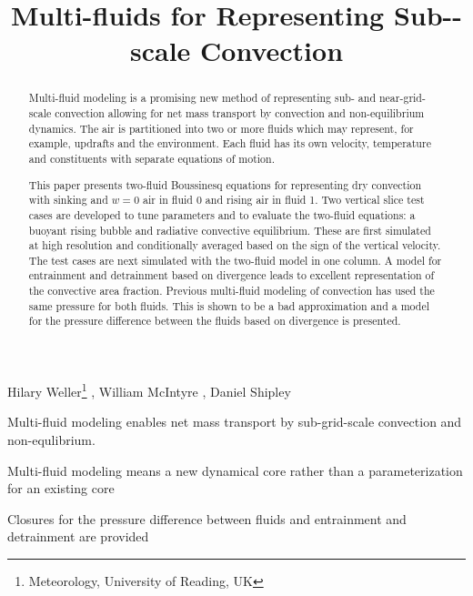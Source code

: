 \documentclass[draft]{agujournal2019}
\begin{document}
\title{Multi-fluids for Representing Sub--scale Convection}

\authors
{
    Hilary Weller\thanks{Meteorology, University of Reading, UK}
    ,
    William McIntyre
    ,
    Daniel Shipley
}



\begin{keypoints}
\item Multi-fluid modeling enables net mass transport by sub-grid-scale convection and non-equlibrium.
\item Multi-fluid modeling means a new dynamical core rather than a parameterization for an existing core
\item Closures for the pressure difference between fluids and entrainment and detrainment are provided
\end{keypoints}

\begin{abstract}
Multi-fluid modeling is a promising new method of representing sub- and near-grid-scale convection allowing for  net mass transport by convection and  non-equilibrium dynamics. The air is partitioned into two or more
fluids which may represent, for example, updrafts and the  environment. Each fluid has its own velocity, temperature and constituents with separate equations of motion.  

This paper presents two-fluid Boussinesq equations for representing  dry convection with sinking and $w=0$ air in fluid 0 and rising air in fluid 1. Two vertical slice test cases are developed to tune parameters and to evaluate the two-fluid equations: a buoyant rising bubble and radiative convective equilibrium. These
are first simulated at high resolution  and conditionally averaged based
on the sign of the vertical velocity. The test cases are next simulated with the two-fluid model  in one column. 
A model for entrainment and detrainment based on divergence  leads to excellent representation of the convective area fraction. Previous multi-fluid modeling of convection has used the same pressure for both fluids. This is shown to be a bad approximation and  a model for the pressure difference between the fluids based on divergence is presented. 
\end{abstract}
\end{document}
